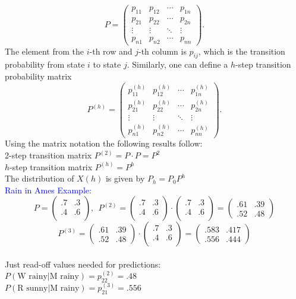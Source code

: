 \documentclass[20pt,landscape]{foils}
\newcommand{\no}{\noindent}
\newcommand{\bul}{\hspace*{.3in}{\textcolor{red}{$\bullet$ \ }}}
\begin{document}
\[P=\begin{pmatrix}p_{11} & p_{12} & \cdots & p_{1n}\\
p_{21} & p_{22} & \cdots & p_{2n}\\
\vdots & \vdots & \ddots & \vdots\\
p_{n1} & p_{n2} & \cdots & p_{nn}
\end{pmatrix}.\]
The element from the $i$-th row and $j$-th column is $p_{ij}$,
which is the transition probability from state $i$ to state $j$.
Similarly, one can define a $h$-step transition probability matrix\\
\[P^{(h)}=\begin{pmatrix}p_{11}^{(h)} & p_{12}^{(h)} & \cdots & p_{1n}^{(h)}\\
p_{21}^{(h)} & p_{22}^{(h)} & \cdots & p_{2n}^{(h)}\\
\vdots & \vdots & \ddots & \vdots\\
p_{n1}^{(h)} & p_{n2}^{(h)} & \cdots & p_{nn}^{(h)}
\end{pmatrix}.\]
\newpage
\no Using the matrix notation the following results follow:\\[.15in]
\bul 2-step transition matrix $P^{(2)}=P\cdot P=P^{2}$\\[.1in]
\bul $h$-step transition matrix $P^{(h)}=P^{h}$\\[.1in]
\bul  The distribution of $X(h)$ is given by $P_{h}=P_{0}P^{h}$\\[.1in]
{\textcolor{blue}{Rain in Ames Example:}}\\
\[P=\begin{pmatrix}.7 & .3 \\
.4 & .6\\
\end{pmatrix}, \ \ P^{(2)}=\begin{pmatrix}.7 & .3 \\
.4 & .6\\
\end{pmatrix} \cdot \begin{pmatrix}.7 & .3 \\
.4 & .6\\
\end{pmatrix}=\begin{pmatrix} .61 &  .39 \\ .52 & .48 \end{pmatrix}\]
 \[P^{(3)}=\begin{pmatrix} .61 &  .39 \\ .52 & .48 \end{pmatrix} \cdot \begin{pmatrix} .7 & .3 \\
.4 & .6\\
\end{pmatrix}=\begin{pmatrix} .583 & .417  \\ .556 & .444 \end{pmatrix}\]\\
Just read-off values needed for predictions: \\[.1in]
\hspace*{1.5in} $P(\text{W rainy}|\text{M rainy})=p_{22}^{(2)}=.48$\\[.1in] 
\hspace*{1.5in} $P(\text{R sunny}|\text{M rainy})=p_{21}^{(3)}=.556$ 
\end{document}
